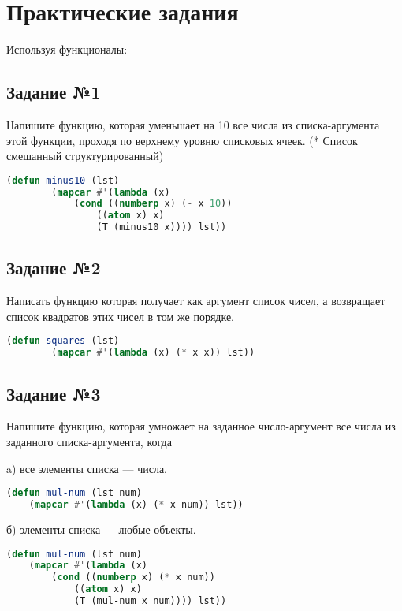\chapter{Практические задания}

Используя функционалы:

\section{Задание №1}

Напишите функцию, которая уменьшает на 10 все числа из списка-аргумента этой функции, проходя по верхнему уровню списковых ячеек.  (* Список смешанный структурированный)

\begin{lstlisting}[language=Lisp]
	(defun minus10 (lst)
		(mapcar #'(lambda (x)
			(cond ((numberp x) (- x 10))
				((atom x) x)
				(T (minus10 x)))) lst))
\end{lstlisting}

\section{Задание №2}

Написать функцию которая получает как аргумент список чисел, а возвращает список квадратов этих чисел в том же порядке.

\begin{lstlisting}[language=Lisp]
	(defun squares (lst)
		(mapcar #'(lambda (x) (* x x)) lst))
\end{lstlisting}

\section{Задание №3}

Напишите функцию, которая умножает на заданное число-аргумент все числа из заданного списка-аргумента, когда

a) все элементы списка --- числа,

\begin{lstlisting}[language=Lisp]
(defun mul-num (lst num)
	(mapcar #'(lambda (x) (* x num)) lst))
\end{lstlisting}

б) элементы списка --- любые объекты.

\begin{lstlisting}[language=Lisp]
(defun mul-num (lst num)
	(mapcar #'(lambda (x)
		(cond ((numberp x) (* x num))
			((atom x) x)
			(T (mul-num x num)))) lst))
\end{lstlisting}

